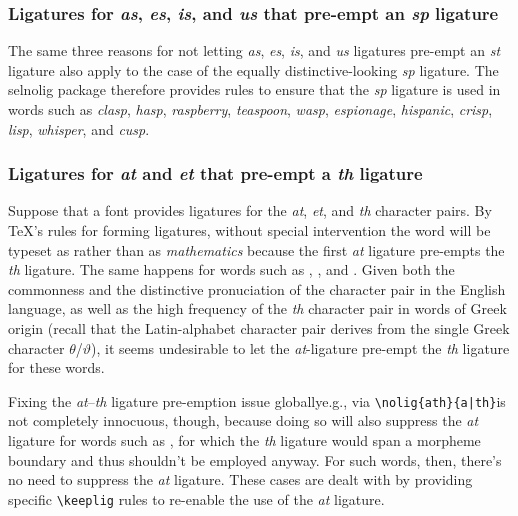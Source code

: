 \documentclass[11pt]{article}
\newcommand{\pkg}[1]{\textsf{#1}}
\newcommand{\opt}[1]{\uselig{\texttt{#1}}}
\newcommand{\cmmd}[1]{\texttt{\textbackslash #1}}
\begin{document}
\subsubsection*{Ligatures for \emph{as}, \emph{\ebg es}, \emph{is}, and \emph{us} that pre-empt an \emph{sp} ligature}

The same three reasons for not letting \emph{as}, \emph{\ebg es}, \emph{is}, and \emph{us} ligatures pre-empt an \emph{st} ligature also apply to the case of the equally distinctive-looking \emph{sp} ligature. The \pkg{selnolig} package therefore provides rules to ensure that the \emph{sp} ligature is used in words such as \emph{clasp}, \emph{hasp}, \emph{raspberry}, \emph{teaspoon}, \emph{wasp}, \emph{\ebg espionage}, \emph{hispanic}, \emph{crisp}, \emph{lisp}, \emph{whisper}, and \emph{cusp}. 



\subsubsection*{Ligatures for \emph{at} and \emph{et} that pre-empt a \emph{th} ligature}

Suppose that a font provides ligatures for the \emph{at}, \emph{et}, and \emph{th} character pairs. By \TeX's rules for forming ligatures, without special intervention the word \opt{mathematics} will be typeset as \emph{} rather than as \emph{mathematics} because the first \emph{at} ligature pre-empts the \emph{th} ligature. The same happens for words such as \emph{}, \emph{}, and \emph{}.
Given both the commonness and the distinctive pronuciation of the \opt{th} character pair in the English language, as well as the high frequency of the \emph{th} character pair in words of Greek origin (recall that the Latin-alphabet \opt{th} character pair derives from the single Greek character $\theta$/$\vartheta$), it seems undesirable to let the \emph{at}-ligature pre-empt the \emph{th} ligature for these words. 

Fixing the \emph{at}--\emph{th} ligature pre-emption issue globally\textemdash e.g., via \Verb+\nolig{ath}{a|th}+\textemdash is not completely innocuous, though, because doing so will also suppress the \emph{at} ligature for words such as \opt{boathook}, for which the \emph{th} ligature would span a morpheme boundary and thus shouldn't be employed anyway. For such words, then, there's no need to suppress the \emph{at} ligature. These cases are dealt with by providing specific \cmmd{keeplig} rules to re-enable the use of the \emph{at} ligature.
\end{document}
